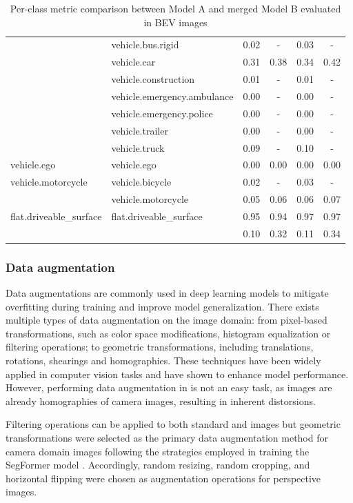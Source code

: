 \begin{table}[h!]
\begin{tabular}{llcccc}
     & vehicle.bus.rigid & 0.02 & - & 0.03 & - \\
     & vehicle.car & 0.31 & 0.38 & 0.34 & 0.42 \\
     & vehicle.construction & 0.01 & - & 0.01 & - \\
     & vehicle.emergency.ambulance & 0.00 & - & 0.00 & - \\
     & vehicle.emergency.police & 0.00 & - & 0.00 & - \\
     & vehicle.trailer & 0.00 & - & 0.00 & - \\
     & vehicle.truck & 0.09 & - & 0.10 & - \\
    \midrule
    vehicle.ego & vehicle.ego & 0.00 & 0.00 & 0.00 & 0.00 \\
    \midrule
    vehicle.motorcycle & vehicle.bicycle & 0.02 & - & 0.03 & - \\
     & vehicle.motorcycle & 0.05 & 0.06 & 0.06 & 0.07 \\
    \midrule
    flat.driveable\_surface & flat.driveable\_surface & 0.95 & 0.94 & 0.97 & 0.97 \\
    \midrule
     & & 0.10 & 0.32 & 0.11 & 0.34 \\
    \bottomrule
    \end{tabular}

    \caption{Per-class metric comparison between Model A and merged Model B evaluated in BEV images}
    \label{tab:merging_comparison_bev}
\end{table}



\subsubsection{Data augmentation}
Data augmentations are commonly used in deep learning models to mitigate overfitting during training and improve model generalization. There exists multiple types of data augmentation on the image domain: from pixel-based transformations, such as color space modifications, histogram equalization or filtering operations; to geometric transformations, including translations, rotations, shearings and homographies. These techniques have been widely applied in computer vision tasks and have shown to enhance model performance. However, performing data augmentation in  is not an easy task, as  images are already homographies of camera images, resulting in inherent distorsions.

Filtering operations can be applied to both standard and  images but geometric transformations were selected as the primary data augmentation method for camera domain images following the strategies employed in training the SegFormer model \cite{segformer}. Accordingly, random resizing, random cropping, and horizontal flipping were chosen as augmentation operations for perspective images.

